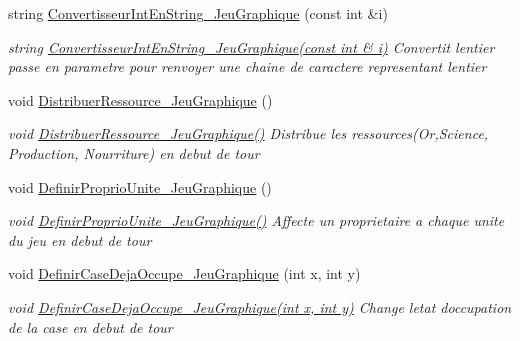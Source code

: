 \begin{DoxyCompactItemize}
string \hyperlink{classJeu__graphique_ae7e0d87cea4c4d9af2d2acfb44bc2fde}{Convertisseur\+Int\+En\+String\+\_\+\+Jeu\+Graphique} (const int \&i)
\begin{DoxyCompactList}\small\item\em string \hyperlink{classJeu__graphique_ae7e0d87cea4c4d9af2d2acfb44bc2fde}{Convertisseur\+Int\+En\+String\+\_\+\+Jeu\+Graphique(const int \& i)} Convertit l\textquotesingle{}entier passe en parametre pour renvoyer une chaine de caractere representant l\textquotesingle{}entier \end{DoxyCompactList}\item 
\mbox{\label{classJeu__graphique_a2f72c853d14fc0dc781876c114868fec}} 
void \hyperlink{classJeu__graphique_a2f72c853d14fc0dc781876c114868fec}{Distribuer\+Ressource\+\_\+\+Jeu\+Graphique} ()
\begin{DoxyCompactList}\small\item\em void \hyperlink{classJeu__graphique_a2f72c853d14fc0dc781876c114868fec}{Distribuer\+Ressource\+\_\+\+Jeu\+Graphique()} Distribue les ressources(\+Or,\+Science, Production, Nourriture) en debut de tour \end{DoxyCompactList}\item 
\mbox{\label{classJeu__graphique_acd20c063f44edc31f4b1fcd9a2b67241}} 
void \hyperlink{classJeu__graphique_acd20c063f44edc31f4b1fcd9a2b67241}{Definir\+Proprio\+Unite\+\_\+\+Jeu\+Graphique} ()
\begin{DoxyCompactList}\small\item\em void \hyperlink{classJeu__graphique_acd20c063f44edc31f4b1fcd9a2b67241}{Definir\+Proprio\+Unite\+\_\+\+Jeu\+Graphique()} Affecte un proprietaire a chaque unite du jeu en debut de tour \end{DoxyCompactList}\item 
void \hyperlink{classJeu__graphique_ab803aa612b0c9fd3b8364eff8835f0c1}{Definir\+Case\+Deja\+Occupe\+\_\+\+Jeu\+Graphique} (int x, int y)
\begin{DoxyCompactList}\small\item\em void \hyperlink{classJeu__graphique_ab803aa612b0c9fd3b8364eff8835f0c1}{Definir\+Case\+Deja\+Occupe\+\_\+\+Jeu\+Graphique(int x, int y)} Change l\textquotesingle{}etat d\textquotesingle{}occupation de la case en debut de tour \end{DoxyCompactList}\item 
\mbox{\label{classJeu__graphique_a5faaece89347dc9c0a6ba9ec8377b53a}} 

\end{DoxyCompactItemize}
